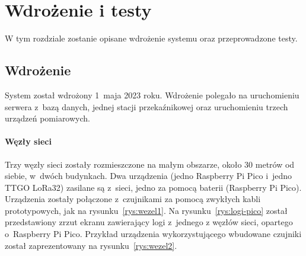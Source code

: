 \chapter{Wdrożenie i testy}
W tym rozdziale zostanie opisane wdrożenie systemu oraz przeprowadzone testy.
\section{Wdrożenie}
System został wdrożony 1~maja 2023 roku.
Wdrożenie polegało na uruchomieniu serwera z~bazą danych, jednej stacji przekaźnikowej oraz uruchomieniu trzech urządzeń pomiarowych.

\subsubsection{Węzły sieci}

Trzy węzły sieci zostały rozmieszczone na małym obszarze, około 30 metrów od siebie, w~dwóch budynkach.
Dwa urządzenia (jedno Raspberry Pi Pico i~jedno TTGO LoRa32) zasilane są z~sieci, jedno za pomocą baterii (Raspberry Pi Pico).
Urządzenia zostały połączone z~czujnikami za pomocą zwykłych kabli prototypowych, jak na rysunku~\ref{rys:wezel1}. %
Na rysunku~\ref{rys:logi-pico} został przedstawiony zrzut ekranu zawierający logi z~jednego z węzłów sieci, opartego o~Raspberry Pi Pico.
Przykład urządzenia wykorzystującego wbudowane czujniki został zaprezentowany na rysunku~\ref{rys:wezel2}.

